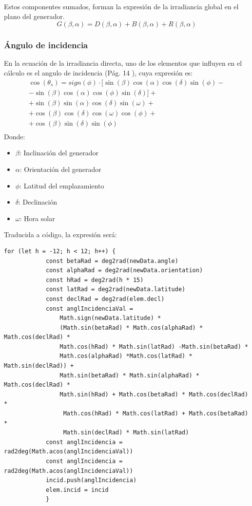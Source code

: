 Estos componentes sumados, forman la expresión de la irradiancia global en el plano del generador.
\begin{equation}
G(\beta,\alpha)=D(\beta,\alpha)+B(\beta,\alpha)+R(\beta,\alpha)
\end{equation}

\subsubsection{Ángulo de incidencia}

En la ecuación de la irradiancia directa, uno de los elementos que influyen en el cálculo es el angulo de incidencia (Pág. 14 \cite{esf_book}), cuya expresión es:
\begin{equation} \label{eqn:ang_incid}
\begin{split}
\cos(\theta_s)=sign(\phi)\cdot [ \sin(\beta)\cos(\alpha)\cos(\delta)\sin(\phi)- \\
-\sin(\beta)\cos(\alpha)\cos(\phi)\sin(\delta)]+ \\
+\sin(\beta)\sin(\alpha)\cos(\delta)\sin(\omega)+ \\
+\cos(\beta)\cos(\delta)\cos(\omega)\cos(\phi)+ \\
+\cos(\beta)\sin(\delta)\sin(\phi) \\
\end{split}
\end{equation}
\newpage
Donde:
\begin{itemize}
\item \textbf{$\beta$}: Inclinación del generador
\item \textbf{$\alpha$}: Orientación del generador
\item \textbf{$\phi$}: Latitud del emplazamiento
\item \textbf{$\delta$}: Declinación
\item \textbf{$\omega$}: Hora solar
\end{itemize}
Traducida a código, la expresión será:
\begin{lstlisting}[style=ES6, caption={Cálculo del ángulo de incidencia}]
		for (let h = -12; h < 12; h++) {
			const betaRad = deg2rad(newData.angle)
			const alphaRad = deg2rad(newData.orientation)
			const hRad = deg2rad(h * 15)
			const latRad = deg2rad(newData.latitude)
			const declRad = deg2rad(elem.decl)
			const anglIncidenciaVal =
				Math.sign(newData.latitude) *
				(Math.sin(betaRad) * Math.cos(alphaRad) * Math.cos(declRad) * 
				Math.cos(hRad) * Math.sin(latRad) -Math.sin(betaRad) * 
				Math.cos(alphaRad) *Math.cos(latRad) * Math.sin(declRad)) +
				Math.sin(betaRad) * Math.sin(alphaRad) * Math.cos(declRad) *
				Math.sin(hRad) + Math.cos(betaRad) * Math.cos(declRad) *
				 Math.cos(hRad) * Math.cos(latRad) + Math.cos(betaRad) * 
				 Math.sin(declRad) * Math.sin(latRad)
			const anglIncidencia = rad2deg(Math.acos(anglIncidenciaVal))
			const anglIncidencia = rad2deg(Math.acos(anglIncidenciaVal))
			incid.push(anglIncidencia)
			elem.incid = incid
			}
\end{lstlisting}
\newpage
